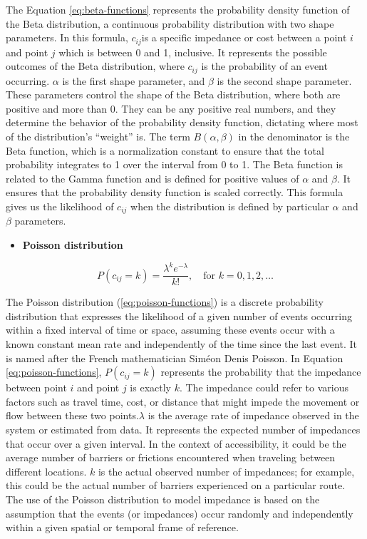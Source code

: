 \documentclass[
11pt, %
oneside, %
english, %
singlespacing, %
]{macthesis} %
\def\tightlist{}
\begin{document}
The Equation \ref{eq:beta-functions} represents the probability density function of the Beta distribution, a continuous probability distribution with two shape parameters. In this formula, \(c_{ij}\)is a specific impedance or cost between a point \(i\) and point \(j\) which is between 0 and 1, inclusive. It represents the possible outcomes of the Beta distribution, where \(c_{ij}\) is the probability of an event occurring. \(\alpha\) is the first shape parameter, and \(\beta\) is the second shape parameter. These parameters control the shape of the Beta distribution, where both are positive and more than 0. They can be any positive real numbers, and they determine the behavior of the probability density function, dictating where most of the distribution's ``weight'' is. The term \(B(\alpha, \beta)\) in the denominator is the Beta function, which is a normalization constant to ensure that the total probability integrates to 1 over the interval from 0 to 1. The Beta function is related to the Gamma function and is defined for positive values of \(\alpha\) and \(\beta\). It ensures that the probability density function is scaled correctly. This formula gives us the likelihood of \(c_{ij}\) when the distribution is defined by particular \(\alpha\) and \(\beta\) parameters.

\begin{itemize}
\tightlist
\item
  \textbf{Poisson distribution}
\end{itemize}

\begin{equation}
P(c_{ij} = k) = \frac{\lambda^k e^{-\lambda}}{k!}, \quad \text{for } k = 0, 1, 2, \ldots
\label{eq:poisson-functions}
\end{equation}

The Poisson distribution (\ref{eq:poisson-functions}) is a discrete probability distribution that expresses the likelihood of a given number of events occurring within a fixed interval of time or space, assuming these events occur with a known constant mean rate and independently of the time since the last event. It is named after the French mathematician Siméon Denis Poisson. In Equation \ref{eq:poisson-functions}, \(P(c_{ij} =k)\) represents the probability that the impedance between point \(i\) and point \(j\) is exactly \(k\). The impedance could refer to various factors such as travel time, cost, or distance that might impede the movement or flow between these two points.\(\lambda\) is the average rate of impedance observed in the system or estimated from data. It represents the expected number of impedances that occur over a given interval. In the context of accessibility, it could be the average number of barriers or frictions encountered when traveling between different locations. \(k\) is the actual observed number of impedances; for example, this could be the actual number of barriers experienced on a particular route. The use of the Poisson distribution to model impedance is based on the assumption that the events (or impedances) occur randomly and independently within a given spatial or temporal frame of reference.
\end{document}
